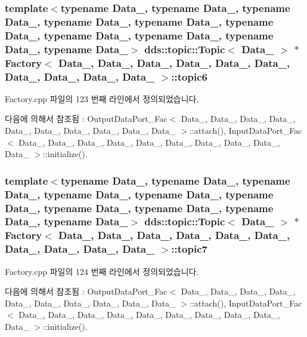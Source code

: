 \subsubsection[{\texorpdfstring{topic6}{topic6}}]{\setlength{\rightskip}{0pt plus 5cm}template$<$typename Data\+\_, typename Data\+\_, typename Data\+\_, typename Data\+\_, typename Data\+\_, typename Data\+\_, typename Data\+\_, typename Data\+\_, typename Data\+\_, typename Data\+\_$>$ dds\+::topic\+::\+Topic$<$ Data\+\_ $>$ $\ast$ {\bf Factory}$<$ Data\+\_, Data\+\_, Data\+\_, Data\+\_, Data\+\_, Data\+\_, Data\+\_, Data\+\_, Data\+\_, Data\+\_ $>$\+::topic6}\hypertarget{classFactory_a9ead1fa2f7352def150a5789f7c47b33}{}\label{classFactory_a9ead1fa2f7352def150a5789f7c47b33}


Factory.\+cpp 파일의 123 번째 라인에서 정의되었습니다.



다음에 의해서 참조됨 \+:  Output\+Data\+Port\+\_\+\+Fac$<$ Data\+\_, Data\+\_, Data\+\_, Data\+\_, Data\+\_, Data\+\_, Data\+\_, Data\+\_, Data\+\_, Data\+\_ $>$\+::attach(), Input\+Data\+Port\+\_\+\+Fac$<$ Data\+\_, Data\+\_, Data\+\_, Data\+\_, Data\+\_, Data\+\_, Data\+\_, Data\+\_, Data\+\_, Data\+\_ $>$\+::initialize().

\subsubsection[{\texorpdfstring{topic7}{topic7}}]{\setlength{\rightskip}{0pt plus 5cm}template$<$typename Data\+\_, typename Data\+\_, typename Data\+\_, typename Data\+\_, typename Data\+\_, typename Data\+\_, typename Data\+\_, typename Data\+\_, typename Data\+\_, typename Data\+\_$>$ dds\+::topic\+::\+Topic$<$ Data\+\_ $>$ $\ast$ {\bf Factory}$<$ Data\+\_, Data\+\_, Data\+\_, Data\+\_, Data\+\_, Data\+\_, Data\+\_, Data\+\_, Data\+\_, Data\+\_ $>$\+::topic7}\hypertarget{classFactory_af496c7d2b15f70cd42cfe0ce20e0656c}{}\label{classFactory_af496c7d2b15f70cd42cfe0ce20e0656c}


Factory.\+cpp 파일의 124 번째 라인에서 정의되었습니다.



다음에 의해서 참조됨 \+:  Output\+Data\+Port\+\_\+\+Fac$<$ Data\+\_, Data\+\_, Data\+\_, Data\+\_, Data\+\_, Data\+\_, Data\+\_, Data\+\_, Data\+\_, Data\+\_ $>$\+::attach(), Input\+Data\+Port\+\_\+\+Fac$<$ Data\+\_, Data\+\_, Data\+\_, Data\+\_, Data\+\_, Data\+\_, Data\+\_, Data\+\_, Data\+\_, Data\+\_ $>$\+::initialize().

